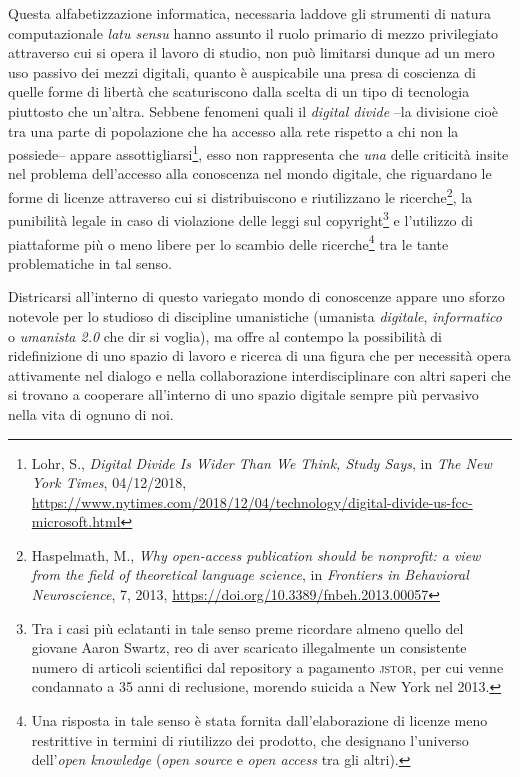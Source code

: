 \documentclass[
  b5paper,
  twoside,
  12pt,
  chapterprefix=false,
  bibliography=totocnumbered,
  parskip=false]{scrbook}
\begin{document}
Questa alfabetizzazione informatica, necessaria laddove gli strumenti di natura computazionale \emph{latu sensu} hanno assunto il ruolo primario di mezzo privilegiato attraverso cui si opera il lavoro di studio, non può limitarsi dunque ad un mero uso passivo dei mezzi digitali, quanto è auspicabile una presa di coscienza di quelle forme di libertà che scaturiscono dalla scelta di un tipo di tecnologia piuttosto che un'altra. Sebbene fenomeni quali il \emph{digital divide} --la divisione cioè tra una parte di popolazione che ha accesso alla rete rispetto a chi non la possiede-- appare assottigliarsi\footnote{Lohr, S., \emph{Digital Divide Is Wider Than We Think, Study Says}, in \emph{The New York Times}, 04/12/2018, \url{https://www.nytimes.com/2018/12/04/technology/digital-divide-us-fcc-microsoft.html}}, esso non rappresenta che \emph{una} delle criticità insite nel problema dell'accesso alla conoscenza nel mondo digitale, che riguardano le forme di licenze attraverso cui si distribuiscono e riutilizzano le ricerche\footnote{Haspelmath, M., \emph{Why open-access publication should be nonprofit: a view from the field of theoretical language science}, in \emph{Frontiers in Behavioral Neuroscience}, 7, 2013, \url{https://doi.org/10.3389/fnbeh.2013.00057}}, la punibilità legale in caso di violazione delle leggi sul copyright\footnote{Tra i casi più eclatanti in tale senso preme ricordare almeno quello del giovane Aaron Swartz, reo di aver scaricato illegalmente un consistente numero di articoli scientifici dal repository a pagamento \textsc{jstor}, per cui venne condannato a 35 anni di reclusione, morendo suicida a New York nel 2013.} e l'utilizzo di piattaforme più o meno libere per lo scambio delle ricerche\footnote{Una risposta in tale senso è stata fornita dall'elaborazione di licenze meno restrittive in termini di riutilizzo dei prodotto, che designano l'universo dell'\emph{open knowledge} (\emph{open source} e \emph{open access} tra gli altri).} tra le tante problematiche in tal senso.

Districarsi all'interno di questo variegato mondo di conoscenze appare uno sforzo notevole per lo studioso di discipline umanistiche (umanista \emph{digitale}, \emph{informatico} o \emph{umanista 2.0} che dir si voglia), ma offre al contempo la possibilità di ridefinizione di uno spazio di lavoro e ricerca di una figura che per necessità opera attivamente nel dialogo e nella collaborazione interdisciplinare con altri saperi che si trovano a cooperare all'interno di uno spazio digitale sempre più pervasivo nella vita di ognuno di noi.
\end{document}
